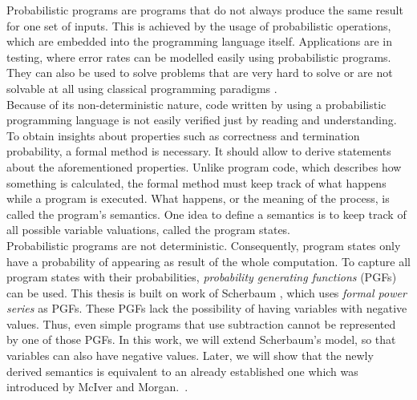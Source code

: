 Probabilistic programs are programs that do not always produce the same result for one set of inputs.
This is achieved by the usage of probabilistic operations, which are embedded into the programming language itself.
Applications are in testing, where error rates can be modelled easily using probabilistic programs.
They can also be used to solve problems that are very hard to solve or are not solvable at all using classical programming paradigms \cite{motwani:randomized}. \\
Because of its non-deterministic nature, code written by using a probabilistic programming language is not easily verified just by reading and understanding.
To obtain insights about properties such as correctness and termination probability, a formal method is necessary.
It should allow to derive statements about the aforementioned properties.
Unlike program code, which describes how something is calculated, the formal method must keep track of what happens while a program is executed.
What happens, or the meaning of the process, is called the program's semantics.
One idea to define a semantics is to keep track of all possible variable valuations, called the program states. \\
Probabilistic programs are not deterministic.
Consequently, program states only have a probability of appearing as result of the whole computation.
To capture all program states with their probabilities, \emph{probability generating functions} (PGFs) can be used.
This thesis is built on work of Scherbaum \cite{clara:pgf}, which uses \emph{formal power series} as PGFs.
These PGFs lack the possibility of having variables with negative values.
Thus, even simple programs that use subtraction cannot be represented by one of those PGFs.
In this work, we will extend Scherbaum's model, so that variables can also have negative values.
Later, we will show that the newly derived semantics is equivalent to an already established one which was introduced by McIver and Morgan.~\cite{mciver:abstraction_refinement}.
